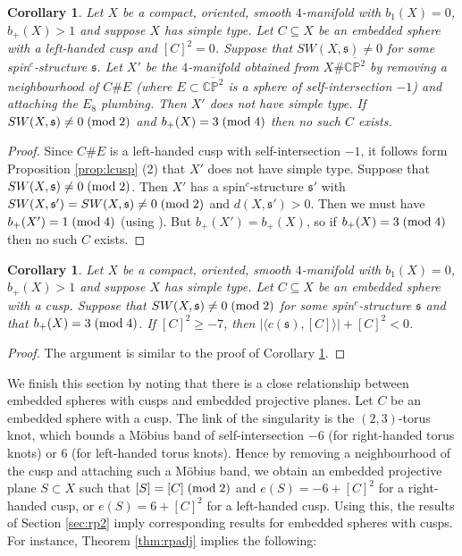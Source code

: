 \documentclass{amsart}
\newtheorem{corollary}[theorem]{Corollary}
\theoremstyle{definition}
\theoremstyle{remark}
\numberwithin{equation}{section}
\begin{document}
\begin{corollary}\label{cor:lcusp0}
Let $X$ be a compact, oriented, smooth $4$-manifold with $b_1(X) = 0$, $b_+(X) > 1$ and suppose $X$ has simple type. Let $C \subseteq X$ be an embedded sphere with a left-handed cusp and $[C]^2 = 0$. Suppose that $SW(X , \mathfrak{s}) \neq 0$ for some spin$^c$-structure $\mathfrak{s}$. Let $X'$ be the $4$-manifold obtained from $X \# \overline{\mathbb{CP}^2}$ by removing a neighbourhood of $C \# E$ (where $E \subset \overline{\mathbb{CP}^2}$ is a sphere of self-intersection $-1$) and attaching the $E_8$ plumbing. Then $X'$ does not have simple type. If $SW(X , \mathfrak{s}) \neq 0 \; ({\rm mod} \; 2)$ and $b_+(X) = 3 \; ({\rm mod} \; 4)$ then no such $C$ exists.
\end{corollary}
\begin{proof}
Since $C \# E$ is a left-handed cusp with self-intersection $-1$, it follows form Proposition \ref{prop:lcusp} (2) that $X'$ does not have simple type. Suppose that $SW(X,\mathfrak{s}) \neq 0 \; ({\rm mod} \; 2)$. Then $X'$ has a spin$^c$-structure $\mathfrak{s}'$ with $SW(X , \mathfrak{s}') = SW(X , \mathfrak{s}) \neq 0 \; ({\rm mod} \; 2)$ and $d(X , \mathfrak{s}') > 0$. Then we must have  $b_+(X') = 1 \; ({\rm mod} \; 4)$ (using \cite[Theorem 1.8]{bar}). But $b_+(X') = b_+(X)$, so if $b_+(X) = 3 \; ({\rm mod} \; 4)$ then no such $C$ exists.
\end{proof}

\begin{corollary}
Let $X$ be a compact, oriented, smooth $4$-manifold with $b_1(X) = 0$, $b_+(X) > 1$ and suppose $X$ has simple type. Let $C \subseteq X$ be an embedded sphere with a cusp. Suppose that $SW(X , \mathfrak{s}) \neq 0 \; ({\rm mod} \; 2)$ for some spin$^c$-structure $\mathfrak{s}$ and that $b_+(X) = 3 \; ({\rm mod} \; 4)$. If $[C]^2 \ge -7$, then $| \langle c(\mathfrak{s}) , [C] \rangle | + [C]^2 < 0$.
\end{corollary}
\begin{proof}
The argument is similar to the proof of Corollary \ref{cor:lcusp0}. 
\end{proof}

We finish this section by noting that there is a close relationship between embedded spheres with cusps and embedded projective planes. Let $C$ be an embedded sphere with a cusp. The link of the singularity is the $(2,3)$-torus knot, which bounds a M\"obius band of self-intersection $-6$ (for right-handed torus knots) or $6$ (for left-handed torus knots). Hence by removing a neighbourhood of the cusp and attaching such a M\"obius band, we obtain an embedded projective plane $S \subset X$ such that $[S] = [C] \; ({\rm mod} \; 2)$ and $e(S) = -6 + [C]^2$ for a right-handed cusp, or $e(S) = 6 + [C]^2$ for a left-handed cusp. Using this, the results of Section \ref{sec:rp2} imply corresponding results for embedded spheres with cusps. For instance, Theorem \ref{thm:rpadj} implies the following:
\end{document}
